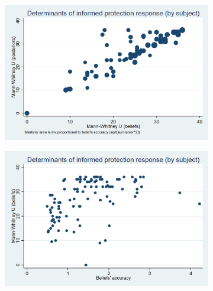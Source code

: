 \documentclass[11pt,a4paper]{article}
\begin{document}
\begin{figure}[!h]
\centering
\caption{Following beliefs vs following posterior probabilities in IP} \label{ref_question}
\begin{subfigure}[t]{.48\textwidth}
  \centering
  \includegraphics[width=\textwidth]{Graphs/clustering.png}
\end{subfigure}
\begin{subfigure}[t]{.48\textwidth}
  \centering
  \includegraphics[width=\textwidth]{Graphs/clustering2.png}
\end{subfigure}
\end{figure}
\end{document}
